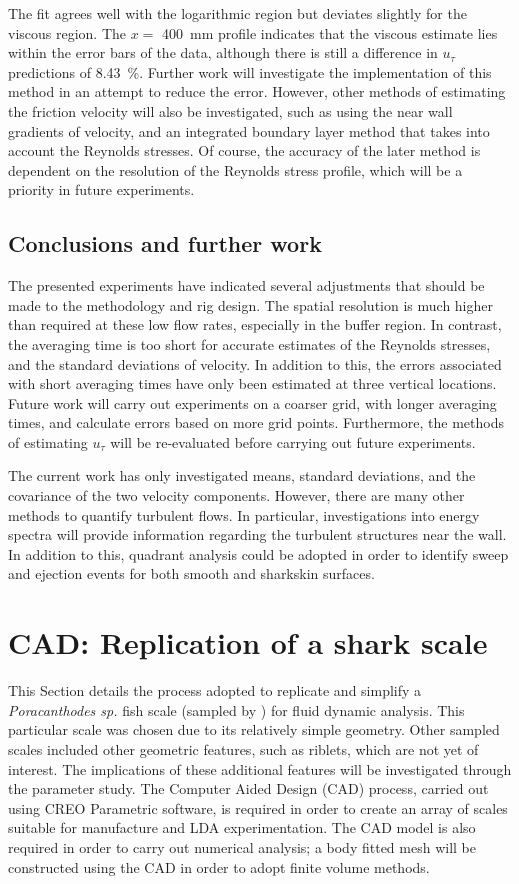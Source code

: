 \documentclass[12pt,oneside,a4paper]{article}
\begin{document}
%
The fit agrees well with the logarithmic region but deviates slightly for the viscous region. The $x=$ \SI{400}{mm} profile indicates that the viscous estimate lies within the error bars of the data, although there is still a difference in $u_\tau$ predictions of \SI{8.43}{\%}. Further work will investigate the implementation of this method in an attempt to reduce the error. However, other methods of estimating the friction velocity will also be investigated, such as using the near wall gradients of velocity, and an integrated boundary layer method that takes into account the Reynolds stresses. Of course, the accuracy of the later method is dependent on the resolution of the Reynolds stress profile, which will be a priority in future experiments. 

\subsection{Conclusions and further work}
The presented experiments have indicated several adjustments that should be made to the methodology and rig design. The spatial resolution is much higher than required at these low flow rates, especially in the buffer region. In contrast, the averaging time is too short for accurate estimates of the Reynolds stresses, and the standard deviations of velocity. In addition to this, the errors associated with short averaging times have only been estimated at three vertical locations. Future work will carry out experiments on a coarser grid, with longer averaging times, and calculate errors based on more grid points. Furthermore, the methods of estimating $u_\tau$ will be re-evaluated before carrying out future experiments.

The current work has only investigated means, standard deviations, and the covariance of the two velocity components. However, there are many other methods to quantify turbulent flows. In particular, investigations into energy spectra will provide information regarding the turbulent structures near the wall. In addition to this, quadrant analysis could be adopted in order to identify sweep and ejection events for both smooth and sharkskin surfaces.


\newpage
\section{CAD: Replication of a shark scale}
\label{section:cad}
This Section details the process adopted to replicate and simplify a \textit{Poracanthodes sp.} fish scale (sampled by \cite{fletcher2014phd}) for fluid dynamic analysis. This particular scale was chosen due to its relatively simple geometry. Other sampled scales included other geometric features, such as riblets, which are not yet of interest. The implications of these additional features will be investigated through the parameter study. The Computer Aided Design (CAD) process, carried out using CREO Parametric software, is required in order to create an array of scales suitable for manufacture and LDA experimentation. The CAD model is also required in order to carry out numerical analysis; a body fitted mesh will be constructed using the CAD in order to adopt finite volume methods.
\end{document}
